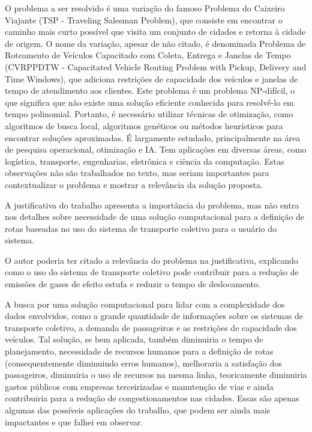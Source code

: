 \documentclass[
    article,
    12pt,
    a4paper,
    english,
    brazil,
    sumario=tradicional
]{/home/lucas_galdino/Desktop/TCC/planning/abntex2/abntex2}
\begin{document}
O problema a ser resolvido é uma variação do famoso Problema do Caixeiro Viajante (TSP - Traveling Salesman Problem), que consiste em encontrar o caminho mais curto possível que visita um conjunto de cidades e retorna à cidade de origem. O nome da variação, apesar de não citado, é denominada Problema de Roteamento de Veículos Capacitado com Coleta, Entrega e Janelas de Tempo (CVRPPDTW - Capacitated Vehicle Routing Problem with Pickup, Delivery and Time Windows), que adiciona restrições de capacidade dos veículos e janelas de tempo de atendimento aos clientes.\newline
Este problema é um problema NP-difícil, o que significa que não existe uma solução eficiente conhecida para resolvê-lo em tempo polinomial. Portanto, é necessário utilizar técnicas de otimização, como algoritmos de busca local, algoritmos genéticos ou métodos heurísticos para encontrar soluções aproximadas. É largamente estudado, principalmente na área de pesquisa operacional, otimização e IA. Tem aplicações em diversas áreas, como logística, transporte, engenharias, eletrônica e ciência da computação. Estas observações não são trabalhados no texto, mas seriam importantes para contextualizar o problema e mostrar a relevância da solução proposta.\par

A justificativa do trabalho apresenta a importância do problema, mas não entra nos detalhes sobre necessidade de uma solução computacional para a definição de rotas baseadas no uso do sistema de transporte coletivo para o usuário do sistema.\par
O autor poderia ter citado a relevância do
problema na justificativa, explicando como o uso do sistema de transporte coletivo pode contribuir para a redução de emissões de gases de efeito estufa e reduzir o tempo de deslocamento.\par

A busca por uma solução computacional para lidar com a complexidade dos dados envolvidos, como a grande quantidade de informações sobre os sistemas de transporte coletivo, a demanda de passageiros e as restrições de capacidade dos veículos. Tal solução, se bem aplicada, também diminuiria o tempo de planejamento, necessidade de recursos humanos para a definição de rotas (consequentemente diminuindo erros humanos), melhoraria a satisfação dos passageiros, diminuiria o uso de recursos na mesma linha, teoricamente diminuiria gastos públicos com empresas terceirizadas e manutenção de vias e ainda contribuiria para a redução de congestionamentos nas cidades. Essas são apenas algumas das possíveis aplicações do trabalho, que podem ser ainda mais impactantes e que falhei em observar.\par
\end{document}
